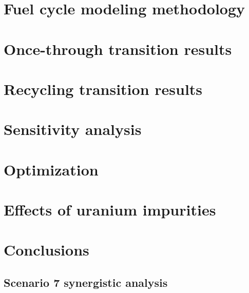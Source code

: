 \documentclass[edeposit,fullpage]{uiucthesis2018}
\begin{document}
\chapter{Fuel cycle modeling methodology} \label{ch:fc_methods}


\chapter{Once-through transition results} \label{ch:once_through_results}


\chapter{Recycling transition results} \label{ch:recycle_results}


\chapter{Sensitivity analysis} \label{ch:sa}


\chapter{Optimization}\label{ch:optimization}


\chapter{Effects of uranium impurities} \label{ch:neutronics}


\chapter{Conclusions} \label{ch:conclusions}


\begin{appendices}
\chapter{Scenario 7 synergistic analysis}\label{app:s7_synergistic}


\end{appendices}

\backmatter



\end{document}
